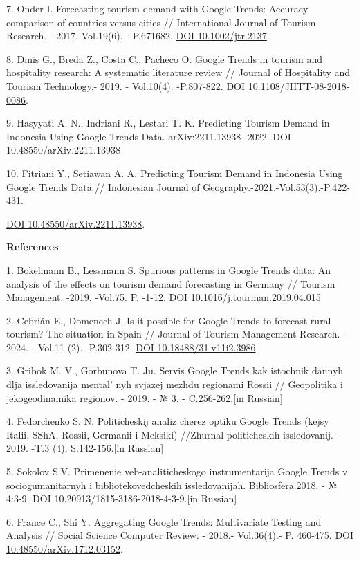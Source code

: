 7. Onder I. Forecasting tourism demand with Google Trends: Accuracy
comparison of countries versus cities // International Journal of
Tourism Research. - 2017.-Vol.19(6). - P.671682.
\href{https://doi.org/10.1002/jtr.2137}{DOI 10.1002/jtr.2137}.

8. Dinis G., Breda Z., Costa C., Pacheco O. Google Trends in tourism and
hospitality research: A systematic literature review // Journal of
Hospitality and Tourism Technology.- 2019. - Vol.10(4). -P.807-822.
DOI
\href{http://dx.doi.org/10.1108/JHTT-08-2018-0086}{10.1108/JHTT-08-2018-0086}.

9. Hasyyati A. N., Indriani R., Lestari T. K. Predicting Tourism Demand
in Indonesia Using Google Trends Data.-arXiv:2211.13938- 2022. DOI
10.48550/arXiv.2211.13938

10. Fitriani Y., Setiawan A. A. Predicting Tourism Demand in Indonesia
Using Google Trends Data // Indonesian Journal of
Geography.-2021.-Vol.53(3).-P.422-431.

\href{https://doi.org/10.48550/arXiv.2211.13938}{DOI
10.48550/arXiv.2211.13938}.

{\bfseries References}

1. Bokelmann B., Lessmann S. Spurious patterns in Google Trends data: An
analysis of the effects on tourism demand forecasting in Germany //
Tourism Management. -2019. -Vol.75. P. -1-12.
\href{https://doi.org/10.1016/j.tourman.2019.04.015}{DOI
10.1016/j.tourman.2019.04.015}

2. Cebrián E., Domenech J. Is it possible for Google Trends to forecast
rural tourism? The situation in Spain // Journal of Tourism Management
Research. - 2024. - Vol.11 (2). -P.302-312.
\href{https://doi.org/10.18488/31.v11i2.3986}{DOI
10.18488/31.v11i2.3986}

3. Gribok M. V., Gorbunova T. Ju. Servis Google Trends kak istochnik
dannyh dlja issledovanija mental' nyh svjazej mezhdu
regionami Rossii // Geopolitika i jekogeodinamika regionov. - 2019. - №
3. - C.256-262.{[}in Russian{]}

4. Fedorchenko S. N. Politicheskij analiz cherez optiku Google Trends
(kejsy Italii, SShA, Rossii, Germanii i Meksiki) //Zhurnal politicheskih
issledovanij. - 2019. -T.3 (4). S.142-156.{[}in Russian{]}

5. Sokolov S.V. Primenenie veb-analiticheskogo instrumentarija Google
Trends v sociogumanitarnyh i bibliotekovedcheskih issledovanijah.
Bibliosfera.2018. - № 4:3-9. DOI 10.20913/1815-3186-2018-4-3-9.{[}in
Russian{]}

6. France C., Shi Y. Aggregating Google Trends: Multivariate Testing and
Analysis // Social Science Computer Review. - 2018.- Vol.36(4).- P.
460-475. DOI
\href{http://dx.doi.org/10.48550/arXiv.1712.03152}{10.48550/arXiv.1712.03152}.

